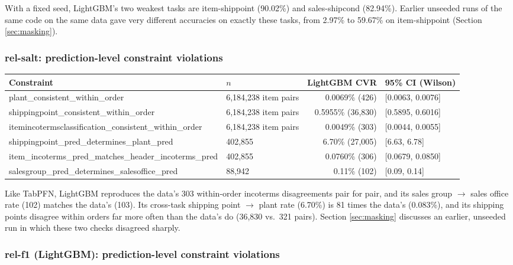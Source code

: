 \documentclass[11pt]{article}
\begin{document}
With a fixed seed, LightGBM's two weakest tasks are item-shippoint (90.02\%) and sales-shipcond
(82.94\%). Earlier unseeded runs of the same code on the same data gave very different
accuracies on exactly these tasks, from 2.97\% to 59.67\% on item-shippoint
(Section \ref{sec:masking}).

\subsubsection{rel-salt: prediction-level constraint violations}

\begin{table}[h]
\centering
\small
\begin{tabularx}{\linewidth}{@{} L{5.9cm} l r l @{}}
\toprule
\textbf{Constraint} & \textbf{$n$} & \textbf{LightGBM CVR} & \textbf{95\% CI (Wilson)} \\
\midrule
plant\_consistent\_within\_order & 6{,}184{,}238 item pairs & 0.0069\% (426) & [0.0063, 0.0076] \\
shippingpoint\_consistent\_within\_order & 6{,}184{,}238 item pairs & 0.5955\% (36{,}830) & [0.5895, 0.6016] \\
itemincotermsclassification\_consistent\_within\_order & 6{,}184{,}238 item pairs & 0.0049\% (303) & [0.0044, 0.0055] \\
shippingpoint\_pred\_determines\_plant\_pred & 402{,}855 & 6.70\% (27{,}005) & [6.63, 6.78] \\
item\_incoterms\_pred\_matches\_header\_incoterms\_pred & 402{,}855 & 0.0760\% (306) & [0.0679, 0.0850] \\
salesgroup\_pred\_determines\_salesoffice\_pred & 88{,}942 & 0.11\% (102) & [0.09, 0.14] \\
\bottomrule
\end{tabularx}
\end{table}

Like TabPFN, LightGBM reproduces the data's 303 within-order incoterms disagreements pair for
pair, and its sales group $\to$ sales office rate (102) matches the data's (103). Its
cross-task shipping point $\to$ plant rate (6.70\%) is 81 times the data's (0.083\%), and its
shipping points disagree within orders far more often than the data's do (36{,}830 vs.\ 321
pairs). Section \ref{sec:masking} discusses an earlier, unseeded run in which these two checks
disagreed sharply.

\subsubsection{rel-f1 (LightGBM): prediction-level constraint violations}
\end{document}
